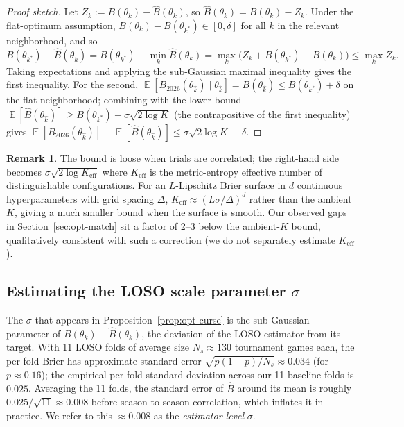 \documentclass[11pt,a4paper]{article}
\theoremstyle{definition}
\newtheorem{remark}[theorem]{Remark}
\DeclareMathOperator{\E}{\mathbb{E}}
\begin{document}
\begin{proof}[Proof sketch]
Let $Z_k := B(\theta_k) - \hat{B}(\theta_k)$, so $\hat{B}(\theta_k) = B(\theta_k) - Z_k$. Under the flat-optimum assumption, $B(\theta_k) - B(\theta_{k^*}) \in [0, \delta]$ for all $k$ in the relevant neighborhood, and so
\[
B(\theta_{k^*}) - \hat{B}(\theta_{\hat{k}}) = B(\theta_{k^*}) - \min_k \hat{B}(\theta_k) = \max_k\bigl(Z_k + B(\theta_{k^*}) - B(\theta_k)\bigr) \le \max_k Z_k.
\]
Taking expectations and applying the sub-Gaussian maximal inequality \citep[Exercise 2.5.10]{vershynin2018} gives the first inequality. For the second, $\E[B_{2026}(\theta_{\hat{k}}) \mid \theta_{\hat{k}}] = B(\theta_{\hat{k}}) \le B(\theta_{k^*}) + \delta$ on the flat neighborhood; combining with the lower bound $\E[\hat{B}(\theta_{\hat{k}})] \ge B(\theta_{k^*}) - \sigma\sqrt{2\log K}$ (the contrapositive of the first inequality) gives $\E[B_{2026}(\theta_{\hat{k}})] - \E[\hat{B}(\theta_{\hat{k}})] \le \sigma\sqrt{2\log K} + \delta$.
\end{proof}

\begin{remark}\label{rmk:effective-K}
The bound is loose when trials are correlated; the right-hand side becomes $\sigma \sqrt{2 \log K_{\mathrm{eff}}}$ where $K_{\mathrm{eff}}$ is the metric-entropy effective number of distinguishable configurations. For an $L$-Lipschitz Brier surface in $d$ continuous hyperparameters with grid spacing $\Delta$, $K_{\mathrm{eff}} \approx (L \sigma / \Delta)^d$ rather than the ambient $K$, giving a much smaller bound when the surface is smooth. Our observed gaps in Section~\ref{sec:opt-match} sit a factor of 2--3 below the ambient-$K$ bound, qualitatively consistent with such a correction (we do not separately estimate $K_{\mathrm{eff}}$).
\end{remark}

\subsection{Estimating the LOSO scale parameter \texorpdfstring{$\sigma$}{sigma}}\label{sec:sigma-estimate}

The $\sigma$ that appears in Proposition~\ref{prop:opt-curse} is the sub-Gaussian parameter of $B(\theta_k) - \hat{B}(\theta_k)$, the deviation of the LOSO estimator from its target. With 11 LOSO folds of average size $N_s \approx 130$ tournament games each, the per-fold Brier has approximate standard error $\sqrt{p(1-p)/N_s} \approx 0.034$ (for $p \approx 0.16$); the empirical per-fold standard deviation across our 11 baseline folds is $0.025$. Averaging the 11 folds, the standard error of $\hat B$ around its mean is roughly $0.025 / \sqrt{11} \approx 0.008$ before season-to-season correlation, which inflates it in practice. We refer to this $\approx 0.008$ as the \emph{estimator-level} $\sigma$.
\end{document}
